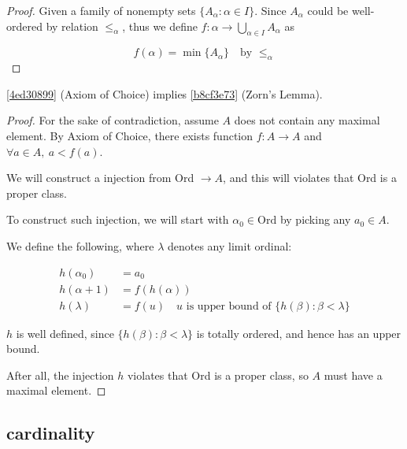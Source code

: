 \begin{proof}
    Given a family of nonempty sets $\{A_{\alpha}: \alpha \in I \}$. Since $A_{\alpha}$ could be well-ordered by 
    relation $\le_{\alpha}$, thus we define $f: \alpha \to \bigcup_{\alpha \in I} A_{\alpha}$ as

    \[
        f(\alpha) = \min \{ A_{\alpha} \} \quad \text{by } \le_{\alpha} 
    \]
\end{proof}

\begin{thm}
    \cref{4ed30899} (Axiom of Choice) implies \cref{b8cf3e73} (Zorn's Lemma).
\end{thm}

\begin{proof}
    For the sake of contradiction, assume $A$ does not contain any maximal element.
    By Axiom of Choice, there exists function $f: A \to A$ and $\forall a \in A,\: a < f(a)$.

    We will construct a injection from Ord $\to A$, and this will violates that Ord is a proper class.

    To construct such injection, we will start with $\alpha_0 \in \mathrm{Ord}$ by picking any $a_0 \in A$.

    We define the following, where $\lambda$ denotes any limit ordinal:

    \begin{align*}
        h(\alpha_0) &= a_0 \\
        h(\alpha + 1) &= f(h(\alpha)) \\
        h(\lambda) & = f(u) \quad u \text{ is upper bound of } \{ h(\beta): \beta < \lambda \}
    \end{align*}

    $h$ is well defined, since $\{ h(\beta): \beta < \lambda \}$ is totally ordered, and hence has an upper bound.

    After all, the injection $h$ violates that Ord is a proper class, so $A$ must have a maximal element.
\end{proof}

\subsection{cardinality}

